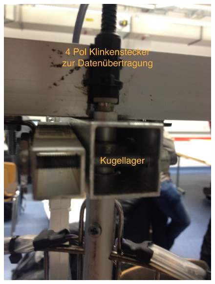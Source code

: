 \begin{frame}{}
\vspace*{-.5cm}
\begin{figure}
\center
\includegraphics[height=\textheight]{Plots/Klinke}
\end{figure}
\end{frame}

